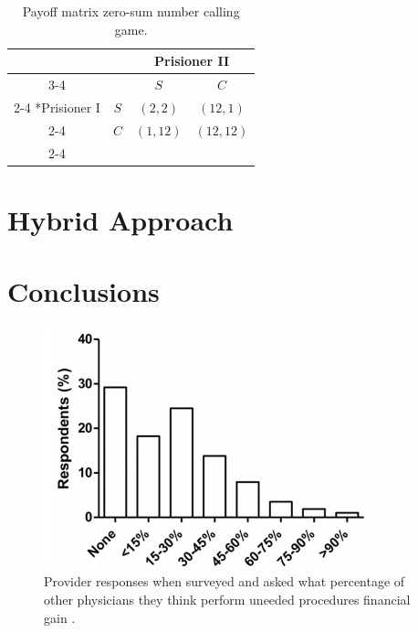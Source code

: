 \documentclass{article}
\begin{document}
\begin{table}[H]
\centering
  \setlength{\extrarowheight}{2pt}
  \begin{tabular}{*{4}{c|}}
    \multicolumn{2}{c}{} & \multicolumn{2}{c}{Prisioner II}\\\cline{3-4}
    \multicolumn{1}{c}{} &  & $S$  & $C$ \\\cline{2-4}
    \multirow{2}*{Prisioner I}  & $S$ & $(2,2)$ & $(12,1)$ \\\cline{2-4}
    & $C$ & $(1,12)$ & $(12,12)$ \\\cline{2-4}
  \end{tabular}
\caption{Payoff matrix zero-sum number calling game.}
\end{table}

\section{Hybrid Approach}

\section{Conclusions}




\begin{figure}
\includegraphics[height=7cm]{overtreat}
\centering
\caption{Provider responses when surveyed and asked what percentage of other physicians they think perform uneeded procedures financial gain \cite{overtreat}.}
\label{fig:overtreat}
\end{figure}

\end{document}
